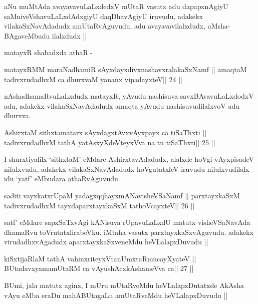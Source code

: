 \begin{artha}
aNu muMtAda avayavavuLaLxdedxV mUtaR vasutx adu dapapxnAgiyU
saMniveVshavuLaLxdAdxgiyU daqDhavAgiyU iruvudu, adakekx
vilakaSxNavAdadudx amUtaRvAguvudu, adu avayavavilalxdudx,
aMsha-BAgaveMbudu ilalxdudx ||

matayxR shabadxda athaR -
\end{artha}

\begin{shl}
matayxRMM maraNadhamiR sAyxdayxdivxnashavxralakaSxNamf ||
amaqtaM tadivxrudadhxM ca dhurxvaM yananx vipadayxteV\hfill || 24 ||
\end{shl}

\begin{artha}
nAshadhamaRvuLaLxdudx matayxR, yAvudu nashisuva savxBAvavuLaLxdodxV
adu, adakekx vilakaSxNavAdadudx amaqta yAvudu nashisuvudilalxvoV adu dhurxva.
\end{artha}

\begin{shl}
AshirxtaM sithxtamatarx sAyxdagxtAvx\s vAyxpayx ca tiSaThxti ||
tadivxrudadhxM tathA yatAsxyXdeVteyxVva na tu tiSaThxti\hfill || 25 ||
\end{shl}

\begin{artha}
I shurxtiyalilx `sithxtaM' eMdare AshirxtavAdadudx, alalxde hoVgi
vAyxpisadeV nilulxvudu, adakekx vilakaSxNavAdadudx hoVgutatxleV
iruvudu nilulxvudilalx idu `yatf' eMbudara athaRvAguvudu.
\end{artha}

\begin{shl}
saditi vayxkatxrUpaM yadagxqqhayxmANavisheVSaNamf ||
parxtayxkaSxM tadivxrudadhxM tayxdaparxtayxkaSxM tathoVcayxteV\hfill || 26 ||
\end{shl}

\begin{artha}
satf' eMdare sapxSaTxvAgi kANisuva rUpavuLaLxdU matutx visheVSaNavAda
dhamaRvu toVrutatxlirabeVku. iMtaha vasutx
parxtayxkaSxvAguvudu. adakekx virudadhxvAgadudx aparxtayxkaSxveneMdu
heVLalapxDuvudu ||
\end{artha}

\begin{shl}
kiSxtijaRlaM tathA vahinxriteyxVtanUmxtaRmucayXyateV ||
BUtadavxyamamUtaRM ca vAyushAcx\s\s kAshameVva ca\hfill || 27 ||
\end{shl}

\begin{artha}
BUmi, jala matutx aginx, I mUru mUtaRveMdu heVLalapxDutatxde AkAsha
vAyu eMba eraDu mahABUtagaLu amUtaRveMdu heVLalapxDuvudu ||
\end{artha}

